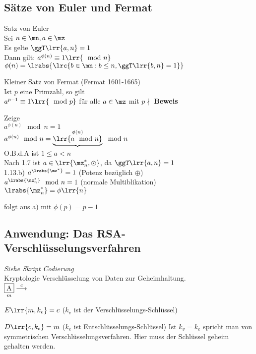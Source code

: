 \subsection{Sätze von Euler und Fermat}
		\item Satz von Euler\\
			Sei $n\in\mn, a\in\mz$\\
			Es gelte $\ggT\lrr{a,n}=1$\\
			Dann gilt: $a^{\phi(n)}\equiv 1\lrr{\mod n}$\\
			$\phi(n)=\lrabs{\lrc{b\in\mn: b\leq n, \ggT\lrr{b,n}=1}}$
		\item Kleiner Satz von Fermat (Fermat 1601-1665)\\
			Ist $p$ eine Primzahl, so gilt\\
			$a^{p-1}\equiv 1\lrr{\mod p}$ für alle $a\in\mz$ mit $p\nmid$
	\subExEnd
	\textbf{Beweis}
		\item Zeige\\
			$a^{\phi(n)}\mod n = 1$\\
			$a^{\phi(n)}\mod n = \underbrace{\lrr{a\mod n}}^{\phi(n)}\mod n$\\
			O.B.d.A ist $1\leq a < n$\\
			Nach 1.7 ist $a\in\lrr{\mz_n^*,\odot}$, da $\ggT\lrr{a,n}=1$\\
			1.13.b) $a^{\lrabs{\mz^*}}=1$ (Potenz bezüglich $\oplus$)\\
			$a^{\lrabs{\mz_n^*}}\mod n = 1$ (normale Multiblikation)\\
			$\lrabs{\mz_n^*}=\phi\lrr{n}$
		\item folgt aus a) mit $\phi(p) = p-1$
	\subExEnd
\subsection{Anwendung: Das RSA-Verschlüsselungsverfahren}
	\textit{Siehe Skript Codierung} \\
	Kryptologie Verschlüsselung von Daten zur Geheimhaltung.\\
	$\underset{m}{\mbox{\fbox{A}}}\overset{c}{\longrightarrow}$
		\item $E\lrr{m,k_v}=c$ ($k_v$ ist der Verschlüsselungs-Schlüssel)
		\item $D\lrr{c,k_e}=m$ ($k_e$ ist Entschlüsselungs-Schlüssel)
	\subExEnd
	Ist $k_v = k_e$ spricht man von symmetrischen Verschlüsselungsverfahren. Hier muss der Schlüssel geheim gehalten werden.


